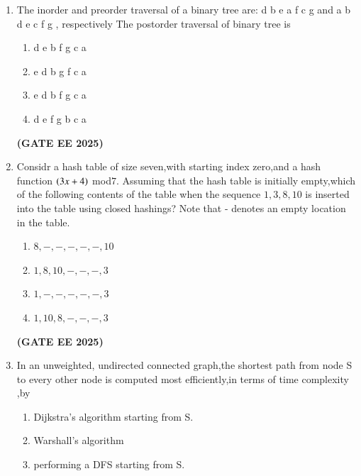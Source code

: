 \documentclass[journal,12pt,onecolumn]{IEEEtran}
\theoremstyle{remark}
\begin{document}
\begin {center}
\begin{enumerate}
\begin{enumerate}
        \item $5,7$
        \item $3,2$
        \item $1,5$
    \end{enumerate}
    \hfill \textbf{(GATE EE 2025)}
         \item The inorder and preorder traversal  of a binary tree  are:
         \newline
         d b e a f c g and a b d e c f g , respectively
         \newline
         The postorder traversal of binary tree is 
         \begin{enumerate}
             \item d e b f g c a
             \item e d b g f c a 
             \item e d b f g c a 
             \item d e f g b c a 
         \end{enumerate}
         \hfill \textbf{(GATE EE 2025)}
         \item Considr a hash table of size seven,with starting index zero,and a hash function $\left(3x+4\right)$ mod$7$. Assuming that the hash table is initially empty,which of the following contents of the table when the sequence $1,3,8,10$ is inserted into the table using closed hashings? Note that - denotes an empty location in the table.
         \begin{enumerate}
             \item  $8,-,-,-,-,-,10$
             \item $1,8,10,-,-,-,3$
             \item $1,-,-,-,-,-,3$
             \item $1,10,8,-,-,-,3$
             \end {enumerate}
             \hfill \textbf{(GATE EE 2025)}
              
             \item In an unweighted, undirected connected  graph,the shortest path from node S to  every other node is computed most efficiently,in terms of time complexity ,by
             \begin{enumerate}
                 \item  Dijkstra's algorithm starting from S.
                 \item Warshall's algorithm
                 \item  performing a DFS starting from S.
                 

\end{enumerate}
\end{enumerate}
\end{center}
\end{document}
